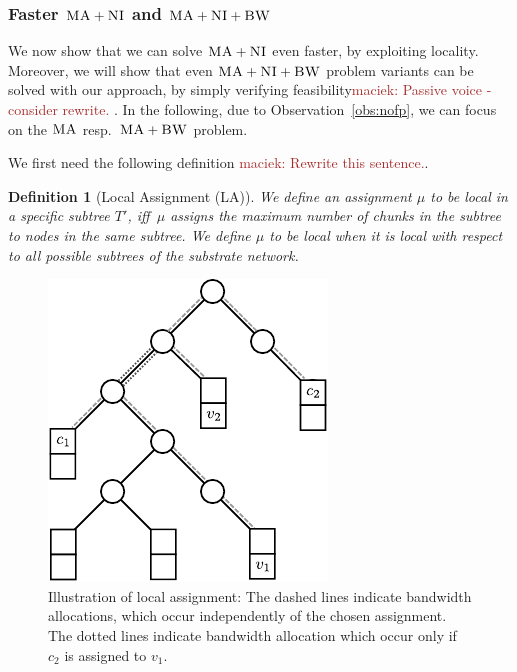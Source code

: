 \documentclass[9pt]{sigcomm-alternate}
\newcommand{\maciek}[1]{\textcolor{brown}{maciek: #1}}
\newcommand{\VmChunkAssignment}{\mu}
\newcommand{\CC}{\textsc{NI}}
\newcommand{\BW}{\textsc{BW}}
\newcommand{\MA}{\textsc{MA}}
\newtheorem{defn}{Definition}
\newcommand{\Tree}{\ensuremath{T}}
\begin{document}
\subsubsection{Faster $\MA+\CC$ and $\MA+\CC+\BW$}

We now show that we can solve $\MA+\CC$ even faster, by exploiting
locality. Moreover, we will show that
even
$\MA+\CC+\BW$ problem variants can be solved with our approach, by simply
verifying feasibility\maciek{Passive voice - consider rewrite.}
.
In the following, due to Observation~\ref{obs:nofp}, we can focus on
the $\MA$ resp.~$\MA+\BW$ problem.

We first need the following definition \maciek{Rewrite this sentence.}.
\begin{defn}[Local Assignment (LA)]\label{def:loc}
We define an assignment $\VmChunkAssignment$ to
be \emph{local in a specific subtree $\Tree'$}, iff~$\VmChunkAssignment$
assigns the maximum number of chunks in the
subtree to nodes in the same subtree.
We define $\VmChunkAssignment$ to be \emph{local} when
it is local with respect to all possible subtrees of the substrate network.
\end{defn}

\begin{figure}
\center
\includegraphics[width = 0.6\columnwidth]{figs/unbalanced_tree}
\caption{Illustration of local assignment: The dashed lines indicate bandwidth allocations, which occur
independently of the chosen assignment. The dotted lines indicate bandwidth
allocation which occur only if $c_2$ is assigned to $v_1$.}
\label{fig:unbalanced_tree}
\end{figure}
\end{document}
